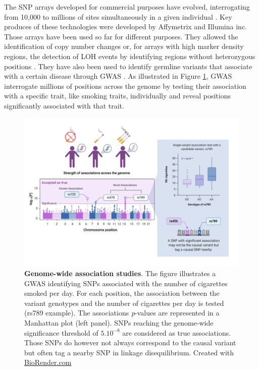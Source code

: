 The \gls*{SNP} arrays developed for commercial purposes have evolved, interrogating from 10,000 to millions of sites simultaneously in a given individual \cite{Xing2016}. Key produces of these technologies were developed by Affymetrix and Illumina inc. Those arrays have been used so far for different purposes. They allowed the identification of copy number changes or, for arrays with high marker density regions, the detection of \gls{LOH} events by identifying regions without heterozygous positions \cite{Beroukhim2006,Dutt2007}. They have also been used to identify germline variants that associate with a certain disease through \gls{GWAS} \cite{XueyingMao2007}. As illustrated in Figure \ref{fig:intro_gwas}, \gls{GWAS} interrogate millions of positions across the genome by testing their association with
a specific trait, like smoking traits, individually and reveal positions significantly associated with that trait.  
\begin{figure}[H]
    \centering
    \includegraphics[width=1\textwidth]{Figures/Intro/GWAS.pdf}
    \caption[Genome-wide association studies]{\textbf{Genome-wide association studies}. The figure illustrates a \gls{GWAS} identifying \gls*{SNP}s associated with the number of cigarettes smoked per day. For each position, the association between the variant genotypes and the number of cigarettes per day is tested (rs789 example). The associations \textit{p}-values are represented in a Manhattan plot (left panel). \gls*{SNP}s reaching the genome-wide significance threshold of $5.10^{-8}$ are considered as true associations. Those \gls*{SNP}s do however not always correspond to the causal variant but often tag a nearby \gls*{SNP} in linkage disequilibrium. Created with \href{https://biorender.com/}{BioRender.com}}
    \label{fig:intro_gwas}
\end{figure}
